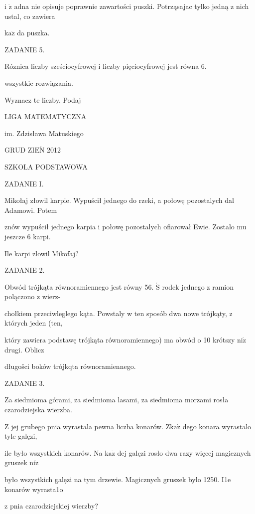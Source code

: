 \documentclass[a4paper,12pt]{article}
\begin{document}
i $\dot{\mathrm{z}}$ adna nie opisuje poprawnie zawartości puszki. Potrząsajac tylko jedną z nich ustal, co zawiera

$\mathrm{k}\mathrm{a}\dot{\mathrm{z}}$ da puszka.

ZADANIE 5.

Róznica liczby sześciocyfrowej i liczby pięciocyfrowej jest równa 6.

wszystkie rozwiązania.

Wyznacz te liczby. Podaj






LIGA MATEMATYCZNA

im. Zdzisława Matuskiego

GRUD Z$\mathrm{I}\mathrm{E}\acute{\mathrm{N}}$ 2012

SZKOLA PODSTAWOWA

ZADANIE I.

Mikołaj złowil karpie. Wypuścił jednego do rzeki, a połowę pozostalych dal Adamowi. Potem

znów wypuścił jednego karpia i połowę pozostalych ofiarował Ewie. Zostalo mu jeszcze 6 karpi.

Ile karpi zlowil Mikofaj?

ZADANIE 2.

Obwód trójkąta równoramiennego jest równy 56. $\acute{\mathrm{S}}$ rodek jednego z ramion polączono z wierz-

chołkiem przeciwleglego kąta. Powstaly w ten sposób dwa nowe trójkąty, z których jeden (ten,

który zawiera podstawę trójkąta równoramiennego) ma obwód o 10 krótszy $\mathrm{n}\mathrm{i}\dot{\mathrm{z}}$ drugi. Oblicz

długošci boków trójkqta równoramiennego.

ZADANIE 3.

Za siedmioma górami, za siedmioma lasami, za siedmioma morzami rosła czarodziejska wierzba.

$\mathrm{Z}$ jej grubego pnia wyrastala pewna liczba konarów. $\mathrm{Z}\mathrm{k}\mathrm{a}\dot{\mathrm{z}}$ dego konara wyrastalo tyle galęzi,

ile było wszystkich konarów. Na $\mathrm{k}\mathrm{a}\dot{\mathrm{z}}$ dej galęzi rosło dwa razy więcej magicznych gruszek $\mathrm{n}\mathrm{i}\dot{\mathrm{z}}$

było wszystkich galęzi na tym drzewie. Magicznych gruszek bylo 1250. I1e konarów wyrasta1o

z pnia czarodziejskiej wierzby?
\end{document}
